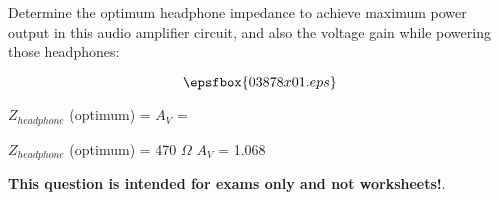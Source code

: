

Determine the optimum headphone impedance to achieve maximum power output in this audio amplifier circuit, and also the voltage gain while powering those headphones:

$$\epsfbox{03878x01.eps}$$

$Z_{headphone}$ (optimum) = \hskip 80pt $A_V$ = 







$Z_{headphone}$ (optimum) = 470 $\Omega$ \hskip 50pt $A_V$ = 1.068







{\bf This question is intended for exams only and not worksheets!}.



